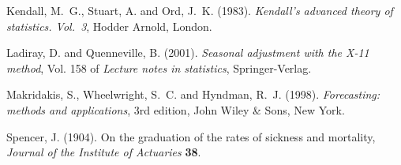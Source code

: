 \documentclass[10pt]{article}
\begin{document}
\begin{thebibliography}{xx}

Kendall, M.~G., Stuart, A. and Ord, J.~K.  (1983). {\em Kendall's advanced theory of statistics.
  Vol.~3}, Hodder Arnold, London.

Ladiray, D. and Quenneville, B.  (2001). {\em Seasonal adjustment with the {X-11} method},
  Vol. 158 of {\em Lecture notes in statistics}, Springer-Verlag.

Makridakis, S., Wheelwright, S.~C. and Hyndman, R.~J.
  (1998). {\em Forecasting: methods and
  applications}, 3rd edition, John Wiley \& Sons, New York.

Spencer, J.  (1904). On the graduation of the
  rates of sickness and mortality, {\em Journal of the Institute of Actuaries}
  {\bf 38}.

\end{thebibliography}
\end{document}
